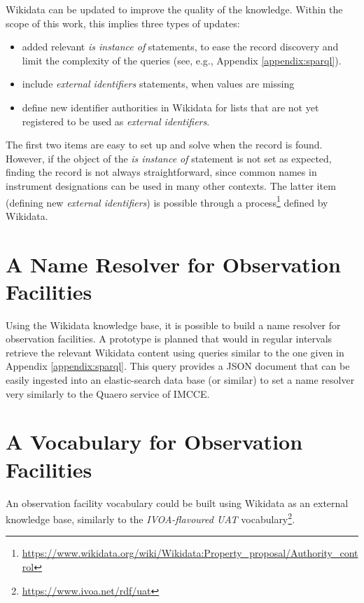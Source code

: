 \documentclass[11pt,a4paper]{ivoa}
\begin{document}
Wikidata can be updated to improve the quality of the knowledge.
Within the scope of this work, this implies three types of updates:
\begin{itemize}
\item added relevant \emph{is instance of} statements, to ease the 
record discovery and limit the complexity of the queries (see, e.g., 
Appendix \ref{appendix:sparql}). 
\item include \emph{external identifiers} statements, when values 
are missing
\item define new identifier authorities in Wikidata for lists that 
are not yet registered to be used as \emph{external identifiers}. 
\end{itemize}
The first two items are easy to set up and solve when the record is 
found. However, if the object of the \emph{is instance of} statement is 
not set as expected, finding the record is not always 
straightforward, since common names in instrument designations 
can be used in many other contexts. 
The latter item (defining new \emph{external identifiers}) is 
possible through a process\footnote{\url{https://www.wikidata.org/wiki/Wikidata:Property_proposal/Authority_control}}
defined by Wikidata. 

\section{A Name Resolver for Observation Facilities}
Using the Wikidata knowledge base, it is possible to build a name
resolver for observation facilities. A prototype is planned that would
in regular intervals retrieve the relevant 
Wikidata content using queries similar to the one
given in Appendix \ref{appendix:sparql}. This query provides
a JSON document that can be easily ingested into an elastic-search
data base (or similar) to set a name resolver very similarly to 
the Quaero service of IMCCE. 

\section{A Vocabulary for Observation Facilities}
An observation facility vocabulary could be built using Wikidata
as an external knowledge base, similarly to the \emph{IVOA-flavoured 
UAT} vocabulary\footnote{\url{https://www.ivoa.net/rdf/uat}}.
\end{document}
